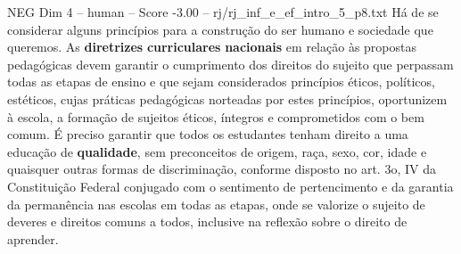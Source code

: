 \begin{textsample}{NEG Dim 4 – human – Score -3.00 – rj/rj\_inf\_e\_ef\_intro\_5\_p8.txt}  \label{ex:f4_neg_001}
Há de se considerar alguns princípios para a construção do ser humano e sociedade que queremos.
As \textbf{diretrizes} \textbf{curriculares} \textbf{nacionais} em relação às propostas pedagógicas devem garantir o cumprimento dos direitos do sujeito que perpassam todas as etapas de ensino e que sejam considerados princípios éticos, políticos, estéticos, cujas práticas pedagógicas norteadas por estes princípios, oportunizem à escola, a formação de sujeitos éticos, íntegros e comprometidos com o bem comum. É preciso garantir que todos os estudantes tenham direito a uma educação de \textbf{qualidade}, sem preconceitos de origem, raça, sexo, cor, idade e quaisquer outras formas de discriminação, conforme disposto no art. 3o, IV da Constituição Federal conjugado com o sentimento de pertencimento e da garantia da permanência nas escolas em todas as etapas, onde se valorize o sujeito de deveres e direitos comuns a todos, inclusive na reflexão sobre o direito de aprender.

\end{textsample}
